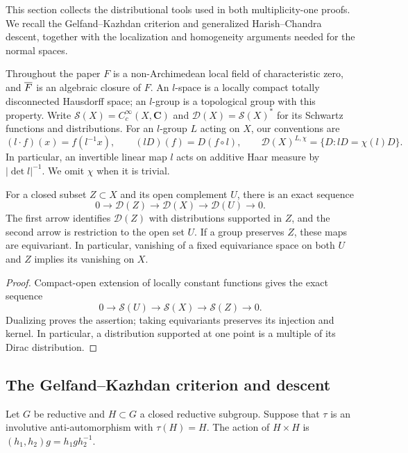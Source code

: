 \label{m1:sec:tools}\label{m2:sec:tools}
This section collects the distributional tools used in both
multiplicity-one proofs. We recall the Gelfand--Kazhdan criterion
and generalized Harish--Chandra descent, together with the
localization and homogeneity arguments needed for the normal spaces.

Throughout the paper $F$ is a non-Archimedean local field of characteristic
zero, and $\overline F$ is an algebraic closure of $F$. An $l$-space is a locally
compact totally disconnected Hausdorff space; an $l$-group is a topological
group with this property. Write $\mathcal S(X)=C_c^\infty(X,\mathbf C)$ and
$\mathcal D(X)=\mathcal S(X)^*$ for its Schwartz functions and distributions. For an
$l$-group $L$ acting on $X$, our conventions are
\begin{equation}\label{m1:eq:distribution-conventions}
 (l\cdot f)(x)=f(l^{-1}x),\qquad (lD)(f)=D(f\circ l),\qquad
 \mathcal D(X)^{L,\chi}=\{D:lD=\chi(l)D\}.
\end{equation}
In particular, an invertible linear map $l$ acts on additive Haar measure
by $|\det l|^{-1}$. We omit $\chi$ when it is trivial.

\begin{proposition}\label{m2:tools:support}
For a closed subset $Z\subset X$ and its open complement $U$, there
is an exact sequence
\[
 0\longrightarrow\mathcal D(Z)\longrightarrow\mathcal D(X)
   \longrightarrow\mathcal D(U)\longrightarrow0.
\]
The first arrow identifies $\mathcal D(Z)$ with distributions supported
in $Z$, and the second arrow is restriction to the open set $U$.
If a group preserves $Z$, these maps are equivariant. In particular,
vanishing of a fixed equivariance space on both $U$ and $Z$ implies
its vanishing on $X$.
\end{proposition}

\begin{proof}
Compact-open extension of locally constant functions gives the exact
sequence
\[
 0\longrightarrow\mathcal S(U)\longrightarrow\mathcal S(X)
  \longrightarrow\mathcal S(Z)\longrightarrow0.
\]
Dualizing proves the assertion; taking equivariants preserves its
injection and kernel. In particular, a distribution supported at one
point is a multiple of its Dirac distribution.
\end{proof}

\subsection{The Gelfand--Kazhdan criterion and descent}
\label{m1:subsec:GK}
Let $G$ be reductive and $H\subset G$ a closed reductive subgroup. Suppose
that $\tau$ is an involutive anti-automorphism with $\tau(H)=H$. The action
of $H\times H$ is $(h_1,h_2)g=h_1gh_2^{-1}$.

